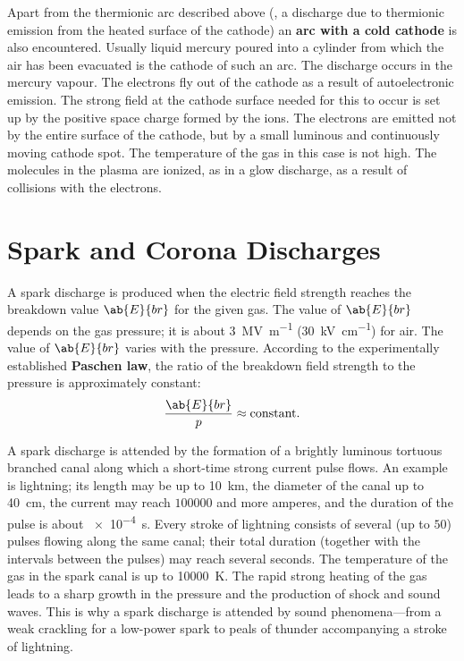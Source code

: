 Apart from the thermionic arc described above (\ie, a discharge due to thermionic emission from the heated surface of the cathode) an \textbf{arc with a cold cathode} is also encountered.
Usually liquid mercury poured into a cylinder from which the air has been evacuated is the cathode of such an arc.
The discharge occurs in the mercury vapour.
The electrons fly out of the cathode as a result of autoelectronic emission.
The strong field at the cathode surface needed for this to occur is set up by the positive space charge formed by the ions.
The electrons are emitted not by the entire surface of the cathode, but by a small luminous and continuously moving cathode spot.
The temperature of the gas in this case is not high.
The molecules in the plasma are ionized, as in a glow discharge, as a result of collisions with the electrons.

\section{Spark and Corona Discharges}\label{sec:12_8}

A spark discharge is produced when the electric field strength reaches the breakdown value $\ab{E}{br}$ for the given gas.
The value of $\ab{E}{br}$ depends on the gas pressure; it is about \SI{3}{\mega\volt\per\metre}  (\SI{30}{\kilo\volt\per\centi\metre}) for air.
The value of $\ab{E}{br}$ varies with the pressure.
According to the experimentally established \textbf{Paschen law}, the ratio of the breakdown field strength to the pressure is approximately constant:
\begin{equation*}
    \frac{\ab{E}{br}}{p} \approx \text{constant}.
\end{equation*}

A spark discharge is attended by the formation of a brightly luminous tortuous branched canal along which a short-time strong current pulse flows.
An example is lightning; its length may be up to \SI{10}{\kilo\metre}, the diameter of the canal up to \SI{40}{\centi\metre}, the current may reach $100 000$ and more amperes, and the duration of the pulse is about \SI{e-4}{\second}.
Every stroke of lightning consists of several (up to $50$) pulses flowing along the same canal; their total duration (together with the intervals between the pulses) may reach several seconds.
The temperature of the gas in the spark canal is up to \SI{10000}{\kelvin}.
The rapid strong heating of the gas leads to a sharp growth in the pressure and the production of shock and sound waves.
This is why a spark discharge is attended by sound phenomena---from a weak crackling for a low-power spark to peals of thunder accompanying a stroke of lightning.

